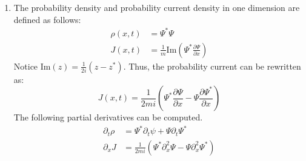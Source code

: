 \begin{sol}
\begin{enumerate}[label=\textbf{(\alph*)}]
    \item
    The probability density and probability current density in one dimension are defined as follows:
    \begin{align}
        \rho(x,t)&=\Psi^*\Psi\\
        J(x,t)&=\frac{1}{m}\text{Im}\left(\Psi^*\frac{\partial\Psi}{\partial x}\right)\label{probabilitycurrent}
    \end{align}
    Notice $\text{Im}(z)=\frac{1}{2i}(z-z^*)$. Thus, the probability current can be rewritten as:
    \begin{equation}
        J(x,t)=\frac{1}{2mi}\left(\Psi^*\frac{\partial\Psi}{\partial x}-\Psi\frac{\partial\Psi^*}{\partial x}\right)
    \end{equation}
    The following partial derivatives can be computed.
    \begin{align}
        \partial_t\rho&=\Psi^*\partial_t\psi+\Psi\partial_t\Psi^*\\
        \partial_xJ&=\frac{1}{2mi}\left(\Psi^*\partial_x^2\Psi-\Psi\partial_x^2\Psi^*\right)
    \end{align}


\end{enumerate}
\end{sol}
